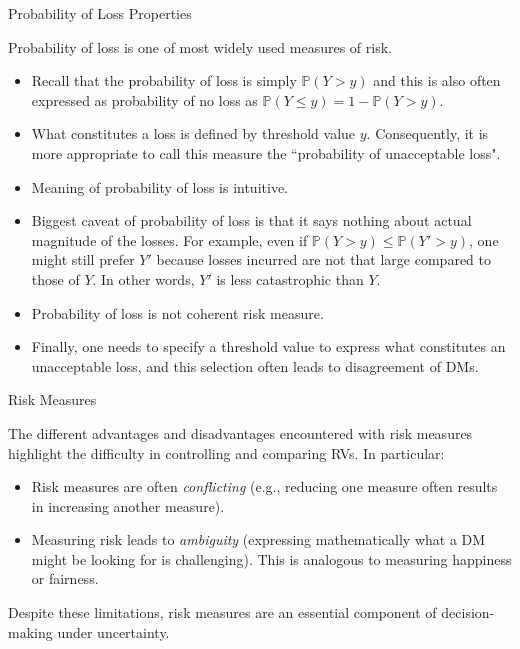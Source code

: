 \documentclass[handout,9pt]{beamer}
\begin{document}
%
\begin{frame}{Probability of Loss Properties}


Probability of loss is one of most widely used measures of risk.  

\begin{itemize}
\setlength{\itemsep}{10pt}
\item Recall that the probability of loss is simply $\mathbb{P}(Y>y)$ and this is also often expressed as probability of no loss as $\mathbb{P}(Y\leq y)=1-\mathbb{P}(Y>y)$. 

\item What constitutes a loss is defined by threshold value $y$. Consequently, it is more appropriate to call this measure the  ``probability of unacceptable loss". 

\item Meaning of probability of loss is intuitive. 

\item Biggest caveat of probability of loss is that it says nothing about actual magnitude of the losses.  For example, even if $\mathbb{P}(Y>y)\leq \mathbb{P}(Y'>y)$, one might still prefer $Y'$ because losses incurred are not that large compared to those of $Y$.  In other words, $Y'$ is less catastrophic than $Y$. 

\item Probability of loss is not coherent risk measure. 

\item Finally, one needs to specify a threshold value to express what constitutes an unacceptable loss, and this selection often leads to disagreement of DMs.

\end{itemize}

\end{frame}


%
\begin{frame}{Risk Measures}

The different advantages and disadvantages encountered with risk measures highlight the difficulty in controlling and comparing RVs. In particular:

\begin{itemize}
\setlength{\itemsep}{10pt}
\item Risk measures are often {\em conflicting} (e.g., reducing one measure often results in increasing another measure). 
\item Measuring risk leads to {\em ambiguity} (expressing mathematically what a DM might be looking for is challenging). This is analogous to measuring happiness or fairness. 
\end{itemize}
Despite these limitations, risk measures are an essential component of decision-making under uncertainty.

\end{frame}
\end{document}
